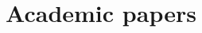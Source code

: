 \documentclass[a4paper,10pt]{article}
\begin{document}





\section{Academic papers}
\end{document}
